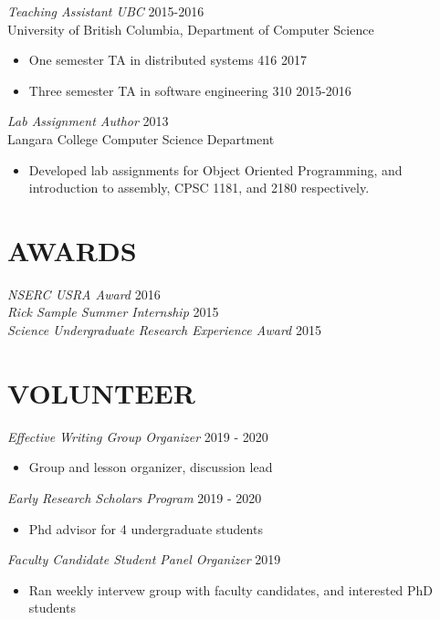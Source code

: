 \documentclass[line,margin]{res}
\begin{document}
\begin{resume}
{\sl Teaching Assistant UBC} \hfill 2015-2016\\
	University of British Columbia, Department of Computer Science
\begin{itemize} \itemsep -2pt
        \item One semester TA in distributed systems 416 \hfill 2017
		\item Three semester TA in software engineering 310 \hfill 2015-2016\\
	\end{itemize}
{\sl Lab Assignment Author} \hfill 2013\\
	Langara College Computer Science Department
	\begin{itemize} \itemsep -2pt
			\item Developed lab assignments for Object Oriented Programming, and introduction to assembly, CPSC 1181, and 2180 respectively.
	\end{itemize}
    

\section{AWARDS}
{\sl NSERC USRA Award} \hfill 2016\\
{\sl Rick Sample Summer Internship} \hfill 2015\\
{\sl Science Undergraduate Research Experience Award} \hfill 2015\\


\section{VOLUNTEER}

{\sl Effective Writing Group Organizer} {\hfill 2019 - 2020}
    \begin{itemize}
        \item Group and lesson organizer, discussion lead
    \end{itemize}

{\sl Early Research Scholars Program} {\hfill 2019 - 2020}
    \begin{itemize}
        \item Phd advisor for 4 undergraduate students
    \end{itemize}

{\sl Faculty Candidate Student Panel Organizer} {\hfill 2019}
    \begin{itemize}
        \item Ran weekly intervew group with faculty
            candidates, and interested PhD students
     \end{itemize}


\end{resume}
\end{document}
